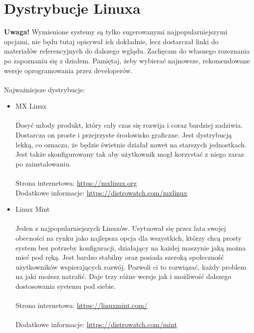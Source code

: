 \documentclass[10pt,a4paper]{report}
\begin{document}
	\section{Dystrybucje Linuxa}
	
\textbf{Uwaga!} Wymienione systemy są tylko sugerowanymi najpopularniejszymi opcjami, nie będu tutaj opisywał ich dokładnie, lecz dostarczał linki do materiałów referencyjnych do dalszego wglądu. Zachęcam do własnego rozeznania po zapoznaniu się z działem. Pamiętaj, żeby wybierać najnowsze, rekomendowane wersje oprogramowania przez developerów.\\\\
Najważniejsze dystrybucje:\\
\begin{itemize}
\item {\Huge MX Linux\\\\} Dosyć młody produkt, który cały czas się rozwija i coraz bardziej zadziwia. Dostarcza on proste i przejrzyste środowisko graficzne. Jest dystrybucją lekką, co oznacza, że będzie świetnie działał nawet na starszych jednostkach. Jest także skonfigurowany tak aby użytkownik mogł korzystać z niego zaraz po zainstalowaniu.\\\\Strona internetowa: \url{https://mxlinux.org}\\ Dodatkowe informacje: \href{https://distrowatch.com/table.php?distribution=mx}{https://distrowatch.com/mxlinux}\\
\item {\Huge Linux Mint \\\\} Jeden z najpopularniejszych Linuxów. Usytuował się przez lata swojej obecności na rynku jako najlepsza opcja dla wszystkich, którzy chcą prosty system bez potrzeby konfiguracji, działający na każdej maszynie jaką można mieć pod ręką. Jest bardzo stabilny oraz posiada szeroką społeczność użytkowników wspierających rozwój. Pozwoli ci to rozwiązać, każdy problem na jaki możesz natrafić. Daje trzy różne wersje jak i możliwość dalszego dostosowania systemu pod siebie.\\\\Strona internetowa: \href{https://www.linuxmint.com/}{https://linuxmint.com/}\\\\ Dodatkowe informacje: \href{https://distrowatch.com/table.php?distribution=mint}{https://distrowatch.com/mint}

\end{itemize}
\end{document}
